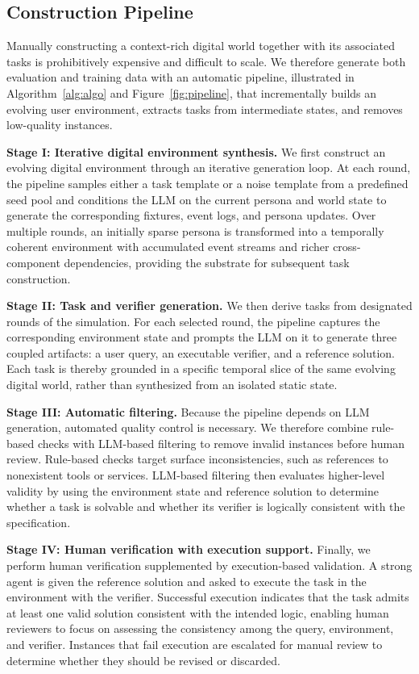 \documentclass{article}
\begin{document}
\subsection{Construction Pipeline}
\label{sec:construction}

Manually constructing a context-rich digital world together with its associated tasks is prohibitively expensive and difficult to scale. We therefore generate both evaluation and training data with an automatic pipeline, illustrated in Algorithm~\ref{alg:algo} and Figure~\ref{fig:pipeline}, that incrementally builds an evolving user environment, extracts tasks from intermediate states, and removes low-quality instances.

\textbf{Stage I: Iterative digital environment synthesis.} We first construct an evolving digital environment through an iterative generation loop. At each round, the pipeline samples either a task template or a noise template from a predefined seed pool and conditions the LLM on the current persona and world state to generate the corresponding fixtures, event logs, and persona updates. Over multiple rounds, an initially sparse persona is transformed into a temporally coherent environment with accumulated event streams and richer cross-component dependencies, providing the substrate for subsequent task construction. 

\textbf{Stage II: Task and verifier generation.} We then derive tasks from designated rounds of the simulation. For each selected round, the pipeline captures the corresponding environment state and prompts the LLM on it to generate three coupled artifacts: a user query, an executable verifier, and a reference solution. Each task is thereby grounded in a specific temporal slice of the same evolving digital world, rather than synthesized from an isolated static state.

\textbf{Stage III: Automatic filtering.} Because the pipeline depends on LLM generation, automated quality control is necessary. We therefore combine rule-based checks with LLM-based filtering to remove invalid instances before human review. Rule-based checks target surface inconsistencies, such as references to nonexistent tools or services. LLM-based filtering then evaluates higher-level validity by using the environment state and reference solution to determine whether a task is solvable and whether its verifier is logically consistent with the specification.

\textbf{Stage IV: Human verification with execution support.} Finally, we perform human verification supplemented by execution-based validation. A strong agent is given the reference solution and asked to execute the task in the environment with the verifier. Successful execution indicates that the task admits at least one valid solution consistent with the intended logic, enabling human reviewers to focus on assessing the consistency among the query, environment, and verifier. Instances that fail execution are escalated for manual review to determine whether they should be revised or discarded.
\end{document}
